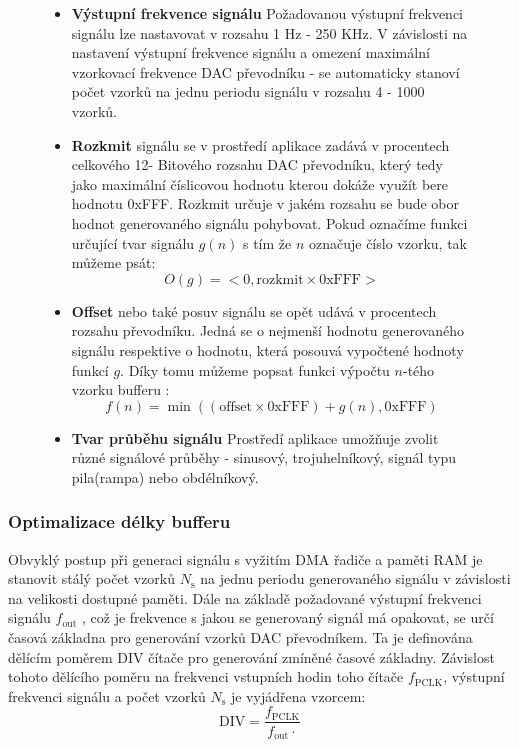 \begin{figure}[H]
\begin{minipage}{0.3\linewidth}
\end{minipage}
\noindent
\begin{minipage}{0.69\linewidth}	
		\begin{itemize}
			\item \textbf{Výstupní frekvence signálu} Požadovanou výstupní frekvenci signálu lze nastavovat v rozsahu 1 Hz - 250 KHz. V závislosti na nastavení výstupní frekvence signálu a omezení maximální vzorkovací frekvence DAC převodníku - se automaticky stanoví počet vzorků na jednu periodu signálu v rozsahu 4 - 1000 vzorků. 
			\item \textbf{Rozkmit} signálu se v prostředí aplikace zadává v procentech celkového 12- Bitového rozsahu DAC převodníku, který tedy jako maximální číslicovou hodnotu kterou dokáže využít bere hodnotu 0xFFF. Rozkmit určuje v jakém rozsahu se bude obor hodnot generovaného signálu pohybovat. Pokud označíme funkci určující tvar signálu $g(n)$ s tím že $n$ označuje číslo vzorku, tak můžeme psát:
			\begin{equation}
				O(g)=<0,\text{rozkmit}\times\text{0xFFF}>
			\end{equation}
			\item \textbf{Offset} nebo také posuv signálu se opět udává v procentech rozsahu převodníku. Jedná se o nejmenší hodnotu generovaného signálu respektive o hodnotu, která  posouvá vypočtené hodnoty funkcí $g$. Díky tomu můžeme popsat funkci výpočtu $n$-tého vzorku bufferu :
					\begin{equation}
				f(n)=\min{\left({(\text{offset}\times\text{0xFFF})+g(n),\text{0xFFF}}\right)}
			\end{equation}
			\item \textbf{Tvar průběhu signálu} Prostředí aplikace umožňuje zvolit různé signálové průběhy - sinusový, trojuhelníkový, signál typu pila(rampa) nebo obdélníkový.			
		\end{itemize}
		
\end{minipage}
\end{figure}

\subsubsection{Optimalizace délky bufferu}
Obvyklý postup při generaci signálu s vyžitím DMA řadiče a paměti RAM je stanovit stálý počet vzorků $N_\text{s}$ na jednu periodu generovaného signálu v závislosti na velikosti dostupné paměti. Dále na základě požadované výstupní frekvenci signálu $f_{\text{out}}$ , což je frekvence s jakou se generovaný signál má opakovat, se určí časová základna pro generování vzorků DAC převodníkem. Ta je definována dělícím poměrem DIV čítače pro generování zmíněné časové základny. Závislost tohoto dělícího poměru na frekvenci vstupních hodin toho čítače $f_{\text{PCLK}}$, výstupní frekvenci signálu a počet vzorků $N_\text{s}$ je vyjádřena vzorcem:
\begin{equation}
	\text{DIV}=\frac{f_{\text{PCLK}}}{	f_{\text{out}}\cdot }
\end{equation} 

